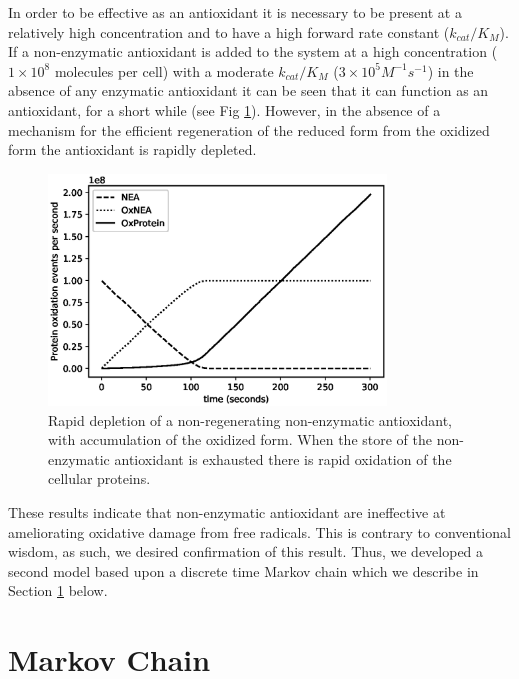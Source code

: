 \documentclass[preprint,12pt,authoryear]{elsarticle}
\begin{document}
In order to be effective as an antioxidant it is necessary to be
present at a relatively high concentration and to have a high forward rate constant ($k_{cat}/K_M$).
If a non-enzymatic antioxidant is added to the system at a high concentration
($1 \times 10^8$ molecules per cell) with a moderate $k_{cat}/K_M$ ($3 \times 10^5 M^{-1} s^{-1}$) in the absence of any
enzymatic antioxidant it can be seen that it can function as an antioxidant, for a short while (see Fig \ref{fig:g3}).
However, in the absence of a mechanism for the efficient regeneration of the
reduced form from the oxidized form the antioxidant is rapidly depleted.


\begin{figure}
\begin{center}
\includegraphics[width=0.8\textwidth]{Fig3.eps}
\end{center}
\caption{\label{fig:g3} Rapid depletion of a non-regenerating non-enzymatic antioxidant, with accumulation of the
oxidized form. When the store of the non-enzymatic antioxidant is exhausted there is rapid oxidation of
the cellular proteins.}
\end{figure}

These results indicate that non-enzymatic antioxidant are ineffective at ameliorating oxidative damage from free radicals.
This is contrary to conventional wisdom, as such, we desired confirmation of this result. Thus, we developed a
second model based upon a discrete time Markov chain which we describe in  Section \ref{sec:mm} below.

\section{Markov Chain}
\label{sec:mm}
\end{document}
